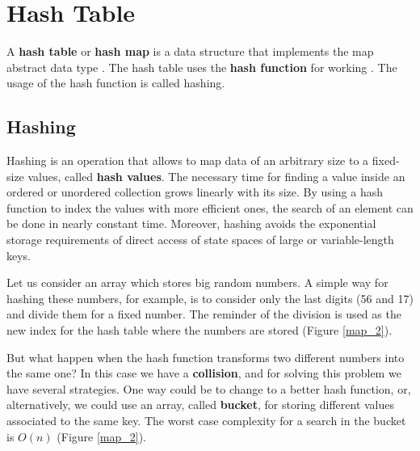 \section{Hash Table}
A \textbf{hash table} or \textbf{hash map} is a data structure that implements the map abstract data type \cite{wikihashtable}. The hash table uses the \textbf{hash function} for working \cite{wikihashfunction}. The usage of the hash function is called hashing.

\subsection{Hashing}
Hashing is an operation that allows to map data of an arbitrary size to a fixed-size values, called \textbf{hash values}. The necessary time for finding a value inside an ordered or unordered collection grows linearly with its size. By using a hash function to index the values with more efficient ones, the search of an element can be done in nearly constant time. Moreover, hashing avoids the exponential storage requirements of direct access of state spaces of large or variable-length keys.

Let us consider an array which stores big random numbers. A simple way for hashing these numbers, for example, is to consider only the last digits (56 and 17) and divide them for a fixed number. The reminder of the division is used as the new index for the hash table where the numbers are stored (Figure \ref{map_2}).

But what happen when the hash function transforms two different numbers into the same one? In this case we have a \textbf{collision}, and for solving this problem we have several strategies. One way could be to change to a better hash function, or, alternatively, we could use an array, called \textbf{bucket}, for storing different values associated to the same key. The worst case complexity for a search in the bucket is \(O(n)\) (Figure \ref{map_2}).

